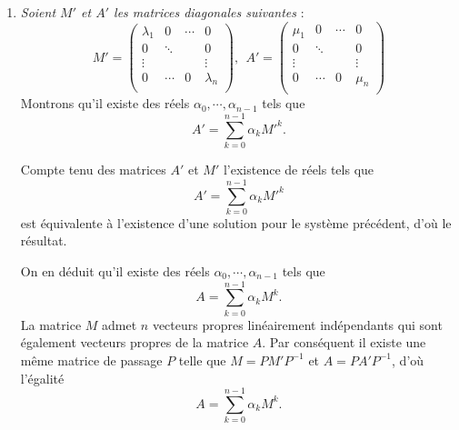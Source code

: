 {{\begin {enumerate}
\begin {enumerate}
Ce d\'eterminant est le d\'eterminant du syst\`eme suivant, 
$$\left\{\begin{aligned}\mu_1&=\alpha_0+\alpha_1\lambda_1+\cdots+\alpha_{n-1}\lambda_1^{n-1} \\ 
\vdots \\  \mu_n &=\alpha_0+\alpha_1\lambda_n+\cdots+\alpha_{n-1}\lambda_n^{n-1} \\ \end{aligned} \right.$$
or $V(\lambda_1,\cdots,\lambda_n)\neq0$ puisque les $\lambda_i$ sont suppos\'es distincts, c'est donc un syst\`eme de Cramer, il admet donc une unique solution $(\alpha_0,\cdots,\alpha_{n-1})\in\R^n.$
    \item {\it Soient $M'$ et $A'$ les matrices diagonales suivantes} :
$$M'=\begin{pmatrix}
\lambda_1 & 0 &\cdots & 0 \\  
0 &\ddots  & & 0 \\ \vdots & &  & \vdots \\  
0 & \cdots & 0 &\lambda_n \\ 
\end{pmatrix},\ \ 
A'=\begin{pmatrix}
\mu_1 & 0 &\cdots & 0 \\  
0 &\ddots  & & 0 \\
\vdots & &  & \vdots \\  
0 & \cdots & 0 &\mu_n \\ 
\end{pmatrix}$$
Montrons qu'il existe des r\'eels $\alpha_0,\cdots,\alpha_{n-1}$ tels que
$$A'=\sum_{k=0}^{n-1}\alpha_k M'^k.$$

Compte tenu des matrices $A'$ et $M'$ l'existence de r\'eels tels que $$A'=\sum_{k=0}^{n-1}\alpha_k M'^k$$ est \'equivalente \`a l'existence d'une solution pour le syst\`eme pr\'ec\'edent, d'o\`u le r\'esultat.

On en d\'eduit qu'il existe des r\'eels $\alpha_0,\cdots,\alpha_{n-1}$ tels que
$$A=\sum_{k=0}^{n-1}\alpha_k M^k.$$ 
La matrice $M$ admet $n$ vecteurs propres lin\'eairement ind\'ependants qui sont \'egalement vecteurs propres de la matrice $A$. Par cons\'equent il existe une m\^eme matrice de passage $P$ telle que $M=PM'P^{-1}$ et $A=PA'P^{-1}$, d'o\`u l'\'egalit\'e 
$$A=\sum_{k=0}^{n-1}\alpha_k M^k.$$   
  \end {enumerate}
\end {enumerate}
}
}

